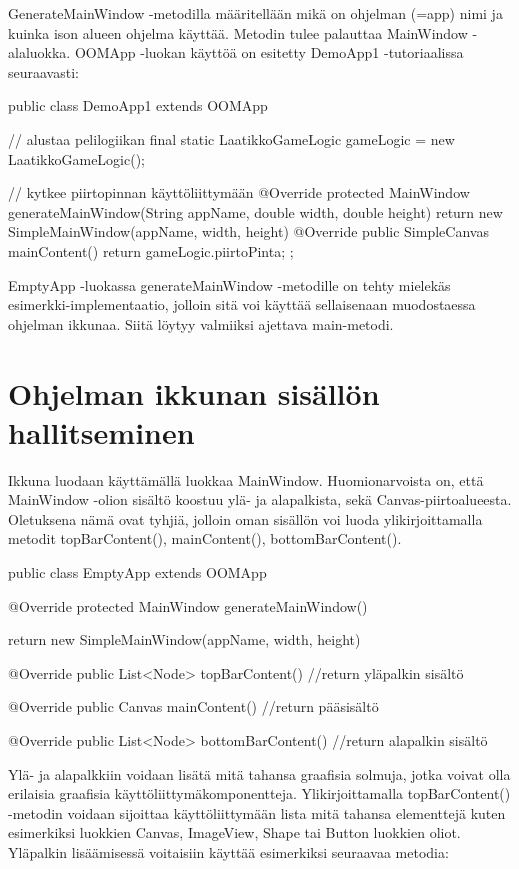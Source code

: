 GenerateMainWindow -metodilla määritellään mikä on ohjelman (=app) nimi ja
kuinka ison alueen ohjelma käyttää. Metodin tulee palauttaa MainWindow
-alaluokka. OOMApp -luokan käyttöä on esitetty DemoApp1 -tutoriaalissa
seuraavasti:

\begin{javacode}
public class DemoApp1 extends OOMApp {
    // alustaa pelilogiikan
    final static LaatikkoGameLogic gameLogic = new LaatikkoGameLogic();

    // kytkee piirtopinnan käyttöliittymään
    @Override
    protected MainWindow generateMainWindow(String appName, double width,
    double height) { return new SimpleMainWindow(appName, width, height) {
            @Override public SimpleCanvas mainContent() {
                return gameLogic.piirtoPinta;
            }
        };
    }
}
\end{javacode}

EmptyApp -luokassa generateMainWindow -metodille on tehty mielekäs
esimerkki-implementaatio, jolloin sitä voi käyttää sellaisenaan muodostaessa
ohjelman ikkunaa. Siitä löytyy valmiiksi ajettava main-metodi.

\section{Ohjelman ikkunan sisällön hallitseminen}

\label{}

Ikkuna luodaan käyttämällä luokkaa MainWindow. Huomionarvoista on, että
MainWindow -olion sisältö koostuu ylä- ja alapalkista, sekä
Canvas-piirtoalueesta. Oletuksena nämä ovat tyhjiä, jolloin oman sisällön voi
luoda ylikirjoittamalla metodit topBarContent(), mainContent(),
bottomBarContent(). 

\begin{javacode}
public class EmptyApp extends OOMApp {
	@Override
	protected MainWindow generateMainWindow(){
		return new SimpleMainWindow(appName, width, height) {
			
			@Override
			public List<Node> topBarContent() { 
				//return yläpalkin sisältö
			}
		
			@Override
			public Canvas mainContent() { 
				//return pääsisältö
			}
		
			@Override
			public List<Node> bottomBarContent() { 
				//return alapalkin sisältö
			}
		}
	}
}
\end{javacode}

Ylä- ja alapalkkiin voidaan lisätä mitä tahansa graafisia solmuja, jotka voivat
olla erilaisia graafisia käyttöliittymäkomponentteja. Ylikirjoittamalla
topBarContent() -metodin voidaan sijoittaa käyttöliittymään lista mitä tahansa
elementtejä kuten esimerkiksi luokkien Canvas, ImageView, Shape tai Button
luokkien oliot. Yläpalkin lisäämisessä voitaisiin käyttää esimerkiksi seuraavaa
metodia:

